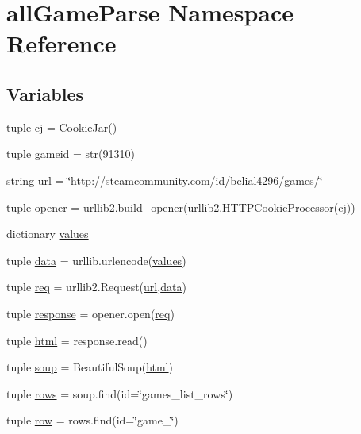 \hypertarget{namespaceall_game_parse}{\section{all\+Game\+Parse Namespace Reference}
\label{namespaceall_game_parse}
}
\subsection*{Variables}
\begin{DoxyCompactItemize}
\item 
tuple \hyperlink{namespaceall_game_parse_a0edb49935fe4f03afaeda24b26701cac}{cj} = Cookie\+Jar()
\item 
tuple \hyperlink{namespaceall_game_parse_a1805ba57761718ea195891b56adac271}{gameid} = str(91310)
\item 
string \hyperlink{namespaceall_game_parse_af48967d69b2b722ff05ad284da8f4bfe}{url} = \char`\"{}http\+://steamcommunity.\+com/id/belial4296/games/\char`\"{}
\item 
tuple \hyperlink{namespaceall_game_parse_a1cefe9996713674c46f624baa334280d}{opener} = urllib2.\+build\+\_\+opener(urllib2.\+H\+T\+T\+P\+Cookie\+Processor(\hyperlink{namespaceall_game_parse_a0edb49935fe4f03afaeda24b26701cac}{cj}))
\item 
dictionary \hyperlink{namespaceall_game_parse_a25e198ad333ea40e9d4eca9e8ac0ce59}{values}
\item 
tuple \hyperlink{namespaceall_game_parse_a8b0c2752622015229ec7c131f733b221}{data} = urllib.\+urlencode(\hyperlink{namespaceall_game_parse_a25e198ad333ea40e9d4eca9e8ac0ce59}{values})
\item 
tuple \hyperlink{namespaceall_game_parse_a5bfed9efebbc641889b00e0505c4a4ae}{req} = urllib2.\+Request(\hyperlink{namespaceall_game_parse_af48967d69b2b722ff05ad284da8f4bfe}{url},\hyperlink{namespaceall_game_parse_a8b0c2752622015229ec7c131f733b221}{data})
\item 
tuple \hyperlink{namespaceall_game_parse_a7bbf07843967c52d1d807c64b6d009d0}{response} = opener.\+open(\hyperlink{namespaceall_game_parse_a5bfed9efebbc641889b00e0505c4a4ae}{req})
\item 
tuple \hyperlink{namespaceall_game_parse_a8dd688b6fdf0d5dc75fd1052e88199da}{html} = response.\+read()
\item 
tuple \hyperlink{namespaceall_game_parse_a6b3a0dce9a39a129a40c94cf1bd1ee9b}{soup} = Beautiful\+Soup(\hyperlink{namespaceall_game_parse_a8dd688b6fdf0d5dc75fd1052e88199da}{html})
\item 
tuple \hyperlink{namespaceall_game_parse_a43d3a3e6df161dd6b906b25ba68e3f08}{rows} = soup.\+find(id=\char`\"{}games\+\_\+list\+\_\+rows\char`\"{})
\item 
tuple \hyperlink{namespaceall_game_parse_a2bdbbc305ed8beb518d32abaf8866039}{row} = rows.\+find(id=\char`\"{}game\+\_\char`\"{})
\end{DoxyCompactItemize}


